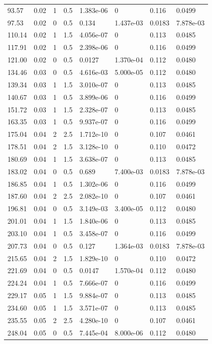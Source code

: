 \documentclass[preview]{standalone}
\begin{document}
{{\begin{tabular}{L{1.2cm}C{1.2cm} C{0.3cm}C{0.5cm} C{1.4cm}C{1.4cm} C{1.4cm}C{1.4cm}}
  93.57  &  0.02  & 1     & 0.5 &  1.383e-06  & 0  & 0.116 &  0.0499   \\ 
  97.53  &  0.02  & 0     & 0.5 &  0.134  & 1.437e-03  & 0.0183 &  7.878e-03   \\ 
  110.14  &  0.02  & 1     & 1.5 &  4.056e-07  & 0  & 0.113 &  0.0485   \\ 
  117.91  &  0.02  & 1     & 0.5 &  2.398e-06  & 0  & 0.116 &  0.0499   \\ 
  121.00  &  0.02  & 0     & 0.5 &  0.0127  & 1.370e-04  & 0.112 &  0.0480   \\ 
  134.46  &  0.03  & 0     & 0.5 &  4.616e-03  & 5.000e-05  & 0.112 &  0.0480   \\ 
  139.34  &  0.03  & 1     & 1.5 &  3.010e-07  & 0  & 0.113 &  0.0485   \\ 
  140.67  &  0.03  & 1     & 0.5 &  3.899e-06  & 0  & 0.116 &  0.0499   \\ 
  151.72  &  0.03  & 1     & 1.5 &  2.328e-07  & 0  & 0.113 &  0.0485   \\ 
  163.35  &  0.03  & 1     & 0.5 &  9.937e-07  & 0  & 0.116 &  0.0499   \\ 
  175.04  &  0.04  & 2     & 2.5 &  1.712e-10  & 0  & 0.107 &  0.0461   \\ 
  178.51  &  0.04  & 2     & 1.5 &  3.128e-10  & 0  & 0.110 &  0.0472   \\ 
  180.69  &  0.04  & 1     & 1.5 &  3.638e-07  & 0  & 0.113 &  0.0485   \\ 
  183.02  &  0.04  & 0     & 0.5 &  0.689  & 7.400e-03  & 0.0183 &  7.878e-03   \\ 
  186.85  &  0.04  & 1     & 0.5 &  1.302e-06  & 0  & 0.116 &  0.0499   \\ 
  187.60  &  0.04  & 2     & 2.5 &  2.082e-10  & 0  & 0.107 &  0.0461   \\ 
  196.81  &  0.04  & 0     & 0.5 &  3.149e-03  & 3.400e-05  & 0.112 &  0.0480   \\ 
  201.01  &  0.04  & 1     & 1.5 &  1.840e-06  & 0  & 0.113 &  0.0485   \\ 
  203.10  &  0.04  & 1     & 0.5 &  3.458e-07  & 0  & 0.116 &  0.0499   \\ 
  207.73  &  0.04  & 0     & 0.5 &  0.127  & 1.364e-03  & 0.0183 &  7.878e-03   \\ 
  215.65  &  0.04  & 2     & 1.5 &  1.829e-10  & 0  & 0.110 &  0.0472   \\ 
  221.69  &  0.04  & 0     & 0.5 &  0.0147  & 1.570e-04  & 0.112 &  0.0480   \\ 
  224.24  &  0.04  & 1     & 0.5 &  7.666e-07  & 0  & 0.116 &  0.0499   \\ 
  229.17  &  0.05  & 1     & 1.5 &  9.884e-07  & 0  & 0.113 &  0.0485   \\ 
  234.60  &  0.05  & 1     & 1.5 &  3.571e-07  & 0  & 0.113 &  0.0485   \\ 
  235.55  &  0.05  & 2     & 2.5 &  4.280e-10  & 0  & 0.107 &  0.0461   \\ 
  248.04  &  0.05  & 0     & 0.5 &  7.445e-04  & 8.000e-06  & 0.112 &  0.0480   \\ 
\hline 
\end{tabular} 

}}
\end{document}
